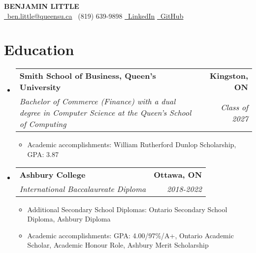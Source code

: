 \documentclass[letterpaper,10pt]{article}
\makeatletter
\newcommand{\resumeItem}[1]{
  \item\small{
    {#1 \vspace{-2pt}}
  }
}
\newcommand{\resumeSubheading}[4]{
  \vspace{-2pt}\item
    \begin{tabular*}{1.0\textwidth}[t]{l@{\extracolsep{\fill}}r}
      \textbf{#1} & \textbf{\small #2} \\
      \textit{\small#3} & \textit{\small #4} \\
    \end{tabular*}\vspace{-7pt}
}
\newcommand{\resumeSubHeadingListStart}{\begin{itemize}[leftmargin=0.0in, label={}]}
\newcommand{\resumeSubHeadingListEnd}{\end{itemize}}
\newcommand{\resumeItemListStart}{\begin{itemize}[label=--]}
\newcommand{\resumeItemListEnd}{\end{itemize}\vspace{-5pt}}
\makeatother
\begin{document}
\begin{center}
    \textbf{\Huge \scshape BENJAMIN LITTLE} \\ \vspace{1pt}
    \scriptsize \href{mailto:ben.little@queensu.ca}{\faEnvelope \ ben.little@queensu.ca} \textbar{} \faPhone \ (819) 639-9898 \textbar{} \href{https://www.linkedin.com/in/your-linkedin-here/}{\faLinkedin \ LinkedIn} \textbar{} \href{https://github.com/your-github-here}{\faGithub \ GitHub}
\end{center}
\vspace{-15pt}

\section{Education}
  \resumeSubHeadingListStart
    \resumeSubheading
      {Smith School of Business, Queen's University}{Kingston, ON}
      {Bachelor of Commerce (Finance) with a dual degree in Computer Science at the Queen's School of Computing}{Class of 2027}
      \resumeItemListStart
        \resumeItem{Academic accomplishments: William Rutherford Dunlop Scholarship, GPA: 3.87}
      \resumeItemListEnd
    \resumeSubheading
      {Ashbury College}{Ottawa, ON}
      {International Baccalaureate Diploma}{2018-2022}
      \resumeItemListStart
        \resumeItem{Additional Secondary School Diplomas: Ontario Secondary School Diploma, Ashbury Diploma}
        \resumeItem{Academic accomplishments: GPA: 4.00/97\%/A+, Ontario Academic Scholar, Academic Honour Role, Ashbury Merit Scholarship}
      \resumeItemListEnd
  \resumeSubHeadingListEnd

\end{document}
